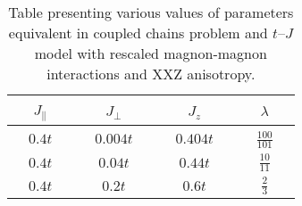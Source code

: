 \documentclass[%
 reprint,
 amsmath,amssymb,
 aps, onecolumn,
prl,
]{revtex4-1}
\begin{document}
\begin{table}[h]
	\begin{center}
	\begin{tabular}{|| c | c || c | c ||} 
		\hline
		~~$J_\parallel$~~ & ~~$J_\perp$~~ & ~~$J_z$~~ & ~~$\lambda$~~ \\
		\hline\hline
		~~$0.4t$~~ & ~~$0.004t$~~ & ~~$0.404t$~~ & ~~$\frac{100}{101}$~~ \\  
		\hline
		$0.4t$ & $0.04t$ & $0.44t$ & $\frac{10}{11}$ \\ 
		\hline
		$0.4t$ & $0.2t$ & $0.6t$ & $\frac{2}{3}$ \\
		\hline
	\end{tabular}
	\end{center}
	\caption{Table presenting various values of parameters equivalent in coupled chains problem and $t$--$J$ model with rescaled magnon-magnon interactions and XXZ anisotropy.}
	\label{tab:params}
\end{table}



\end{document}

